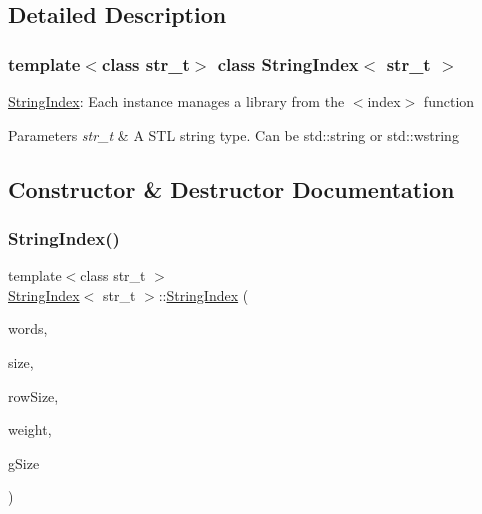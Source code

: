 \subsection{Detailed Description}
\subsubsection*{template$<$class str\+\_\+t$>$\newline
class String\+Index$<$ str\+\_\+t $>$}

\mbox{\hyperlink{class_string_index}{String\+Index}}\+: Each instance manages a library from the $<$index$>$ function 
\begin{DoxyParams}{Parameters}
{\em str\+\_\+t} & A S\+TL string type. Can be std\+::string or std\+::wstring \\
\hline
\end{DoxyParams}


\subsection{Constructor \& Destructor Documentation}
\mbox{\label{class_string_index_aec0c7112ef81d953265033f9a779730f}} 
\subsubsection{\texorpdfstring{String\+Index()}{StringIndex()}\hspace{0.1cm}{\footnotesize\ttfamily [1/3]}}
{\footnotesize\ttfamily template$<$class str\+\_\+t $>$ \\
\mbox{\hyperlink{class_string_index}{String\+Index}}$<$ str\+\_\+t $>$\+::\mbox{\hyperlink{class_string_index}{String\+Index}} (\begin{DoxyParamCaption}\item[{\mbox{\hyperlink{class_string_index_a47f131c73d15a7c10c10a9748adf45dc}{char\+\_\+t}} $\ast$$\ast$const}]{words,  }\item[{const size\+\_\+t}]{size,  }\item[{const uint16\+\_\+t}]{row\+Size,  }\item[{float $\ast$const}]{weight,  }\item[{const uint16\+\_\+t}]{g\+Size }\end{DoxyParamCaption})}

